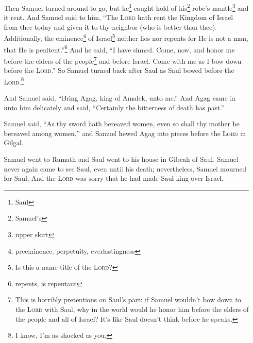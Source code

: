 \begin{inparaenum}
     Then Samuel turned around to go, but he\footnote{Saul} caught hold of his\footnote{Samuel's} robe's mantle\footnote{upper skirt} and it rent.%
     And Samuel said to him, ``The \textsc{Lord} hath rent the Kingdom of Israel from thee today and given it to thy neighbor (who is better than thee).%
     Additionally, the eminence\footnote{preeminence, perpetuity, everlastingness} of Israel\footnote{Is this a name-title of the \textsc{Lord}?} neither lies nor repents for He is not a man, that He is penitent.''\footnote{repents, is repentant}%
     And he said, ``I have sinned. Come, now, and honor me before the elders of the people\footnote{This is horribly pretentious on Saul's part: if Samuel wouldn't bow down to the \textsc{Lord} with Saul, why in the world would he honor him before the elders of the people and all of Israel? It's like Saul doesn't think before he speaks.} and before Israel. Come with me as I bow down before the \textsc{Lord}.''%
     So Samuel turned back after Saul as Saul bowed before the \textsc{Lord}.\footnote{I know, I'm as shocked as you.}%
    
     And Samuel said, ``Bring Agag, king of Amalek, unto me.'' And Agag came in unto him delicately and said, ``Certainly the bitterness of death has past.''%
    
     Samuel said, ``As thy sword hath bereaved women, even so shall thy mother be bereaved among women,'' and Samuel hewed Agag into pieces before the \textsc{Lord} in Gilgal.%
    
     Samuel went to Ramath and Saul went to his house in Gibeah of Saul.%
     Samuel never again came to see Saul, even until his death; nevertheless, Samuel mourned for Saul. And the \textsc{Lord} was sorry that he had made Saul king over Israel.%
\end{inparaenum}
